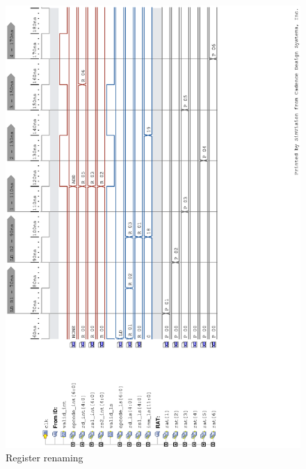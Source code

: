 \documentclass[12pt,a4paper]{article} %
\begin{document}
\begin{figure}[!p]
	\centering
	\includegraphics[width=\textwidth, trim = {1.5cm 1.5cm 1.5cm 1.5cm}]{Source/Waveforms/renaming.eps}
	\caption{Register renaming} 
	\label{fig-renaming}
\end{figure}
\end{document}
